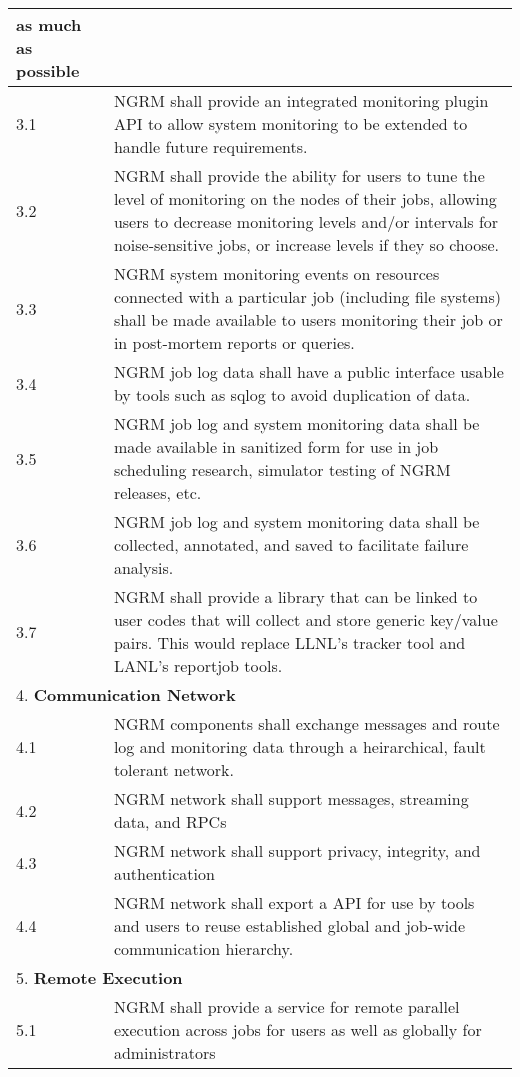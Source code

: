 \begin{longtable}{|p{1cm}|p{15cm}|}
	as much as possible\\
  \hline
  3.1 & NGRM shall provide an integrated monitoring plugin API to allow
	system monitoring to be extended to handle future requirements.\\
  \hline
  3.2 & NGRM shall provide the ability for users to tune the level of
	monitoring on the nodes of their jobs, allowing users to decrease
	monitoring levels and/or intervals for noise-sensitive jobs, or
	increase levels if they so choose.\\
  \hline
  3.3 & NGRM system monitoring events on resources connected with a particular
	job (including file systems) shall be made available to users
	monitoring their job or in post-mortem reports or queries.\\
  \hline
  3.4 & NGRM job log data shall have a public interface usable by tools
	such as sqlog to avoid duplication of data.\\
  \hline
  3.5 & NGRM job log and system monitoring data shall be made available in
	sanitized form for use in job scheduling research, simulator testing
	of NGRM releases, etc.\\
  \hline
  3.6 & NGRM job log and system monitoring data shall be collected,
	annotated, and saved to facilitate failure analysis.\\
  \hline
  3.7 & NGRM shall provide a library that can be linked to user codes that
	will collect and store generic key/value pairs.  This would replace
	LLNL's tracker tool and LANL's reportjob tools.\\
  \hline
  \multicolumn{2}{|l|}{4. \textbf{Communication Network}} \\
  \hline
  4.1 & NGRM components shall exchange messages and route log and monitoring
	data through a heirarchical, fault tolerant network.\\
  \hline
  4.2 & NGRM network shall support messages, streaming data, and RPCs\\
  \hline
  4.3 & NGRM network shall support privacy, integrity, and authentication\\
  \hline
  4.4 & NGRM network shall export a API for use by tools and users to reuse
	established global and job-wide communication hierarchy.\\
  \hline
  \multicolumn{2}{|l|}{5. \textbf{Remote Execution}} \\
  \hline
  5.1 & NGRM shall provide a service for remote parallel execution across
	jobs for users as well as globally for administrators\\

\end{longtable}
